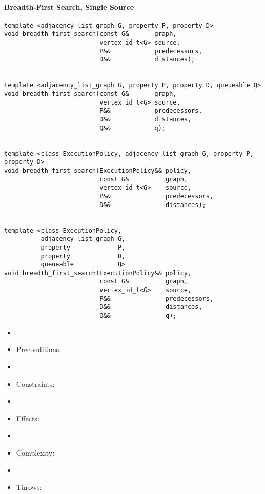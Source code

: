 \paragraph{Breadth-First Search, Single Source}
\begin{lstlisting}
template <adjacency_list_graph G, property P, property D>
void breadth_first_search(const G&       graph,
                          vertex_id_t<G> source,
                          P&&            predecessors,
                          D&&            distances);


template <adjacency_list_graph G, property P, property D, queueable Q>
void breadth_first_search(const G&       graph,
                          vertex_id_t<G> source,
                          P&&            predecessors,
                          D&&            distances,
                          Q&&            q);


template <class ExecutionPolicy, adjacency_list_graph G, property P, property D>
void breadth_first_search(ExecutionPolicy&& policy,
                          const G&          graph,
                          vertex_id_t<G>    source,
                          P&&               predecessors,
                          D&&               distances);


template <class ExecutionPolicy,
          adjacency_list_graph G,
          property             P,
          property             D,
          queueable            Q>
void breadth_first_search(ExecutionPolicy&& policy,
                          const G&          graph,
                          vertex_id_t<G>    source,
                          P&&               predecessors,
                          D&&               distances,
                          Q&&               q);

\end{lstlisting}
\begin{itemize}
\item[] \item{Preconditions:} 
\item[] \item{Constraints:}
\item[] \item{Effects:}
\item[] \item{Complexity:} 
\item[] \item{Throws:} 
\end{itemize}



